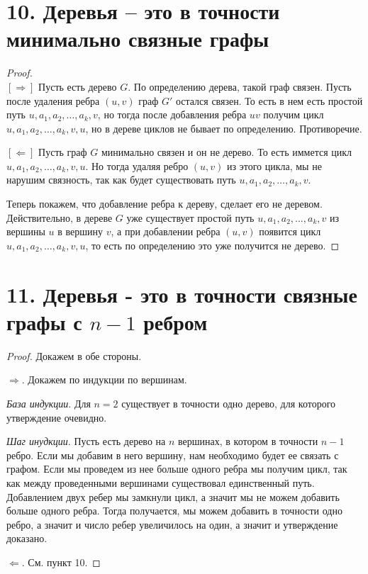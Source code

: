 \documentclass[a4paper,12pt]{article}
\begin{document}
    \section*{10. Деревья -- это в точности минимально связные графы}
    \begin{proof}\ \\
            $[\Rightarrow]$ Пусть есть дерево $G$. По определению дерева, такой граф связен. Пусть после удаления ребра $(u,v)$ граф $G'$ остался связен. То есть в нем есть простой путь $u, a_{1}, a_{2}, \ldots, a_{k}, v$, но тогда после добавления ребра $uv$ получим цикл $u, a_{1}, a_{2}, \ldots, a_{k}, v, u$, но в дереве циклов не бывает по определению. Противоречие.

            \noindent$[\Leftarrow]$ Пусть граф $G$ минимально связен и он не дерево. То есть иммется цикл $u, a_{1}, a_{2}, \ldots, a_{k}, v, u$. Но тогда удаляя ребро $(u, v)$ из этого цикла, мы не нарушим связность, так как будет существовать путь $u, a_{1}, a_{2}, \ldots, a_{k}, v$.

            \noindent Теперь покажем, что добавление ребра к дереву, сделает его не деревом. Действительно, в дереве $G$ уже существует простой путь $u, a_{1}, a_{2}, \ldots, a_{k}, v$ из вершины $u$ в вершину $v$, а при добавлении ребра $(u, v)$ появится цикл $u, a_{1}, a_{2}, \ldots, a_{k}, v, u$, то есть по определению это уже получится не дерево. 
    \end{proof}

    \section*{11. Деревья - это в точности связные графы с $n - 1$ ребром}
    \begin{proof}
        Докажем в обе стороны.
        
        $\Rightarrow$. Докажем по индукции по вершинам.
        
        \textit{База индукции}. Для $n = 2$ существует в точности одно дерево, для которого утверждение очевидно.
        
        \textit{Шаг инудкции}. Пусть есть дерево на $n$ вершинах, в котором в точности $n - 1$ ребро. Если мы добавим в него вершину, нам необходимо будет ее связать с графом. Если мы проведем из нее больше одного ребра мы получим цикл, так как между проведенными вершинами существовал единственный путь. Добавлением двух ребер мы замкнули цикл, а значит мы не можем добавить больше одного ребра. Тогда получается, мы можем добавить в точности одно ребро, а значит и число ребер увеличилось на один, а значит и утверждение доказано.
        
        $\Leftarrow$. См. пункт 10.
        
        
    \end{proof}
\end{document}

